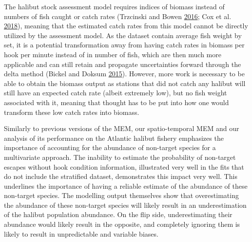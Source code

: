 \documentclass[12pt]{article}\usepackage[]{graphicx}\usepackage[]{color}
\begin{document}
The halibut stock assessment model requires indices of biomass instead of numbers of fish caught or catch rates (Trzcinski and Bowen \protect\hyperlink{ref-Trzcinski2016}{2016}; Cox et al. \protect\hyperlink{ref-Cox2018}{2018}), meaning that the estimated catch rates from this model cannot be directly utilized by the assessment model. As the dataset contain average fish weight by set, it is a potential transformation away from having catch rates in biomass per hook per minute instead of in number of fish, which are then much more applicable and can still retain and propagate uncertainties forward through the delta method (Bickel and Doksum \protect\hyperlink{ref-Bickel2015}{2015}). However, more work is necessary to be able to obtain the biomass output as stations that did not catch any halibut will still have an expected catch rate (albeit extremely low), but no fish weight associated with it, meaning that thought has to be put into how one would transform these low catch rates into biomass.

Similarly to previous versions of the MEM, our spatio-temporal MEM and our analysis of its performance on the Atlantic halibut fishery emphasizes the importance of accounting for the abundance of non-target species for a multivariate approach. The inability to estimate the probability of non-target escapes without hook condition information, illustrated very well in the fits that do not include the stratified dataset, demonstrates this impact very well. This underlines the importance of having a reliable estimate of the abundance of these non-target species. The modelling output themselves show that overestimating the abundance of these non-target species will likely result in an underestimation of the halibut population abundance. On the flip side, underestimating their abundance would likely result in the opposite, and completely ignoring them is likely to result in unpredictable and variable biases.
\end{document}
